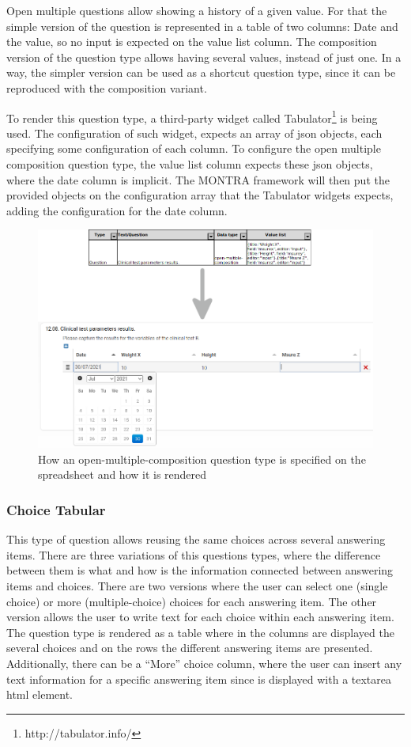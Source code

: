 Open multiple questions allow showing a history of a given value.
For that the simple version of the question is represented in a table of two columns: Date and the value, so no input is expected on the value list column.
The composition version of the question type allows having several values, instead of just one.
In a way, the simpler version can be used as a shortcut question type, since it can be reproduced with the composition variant.

To render this question type, a third-party widget called Tabulator\footnote{http://tabulator.info/} is being used.
The configuration of such widget, expects an array of \gls{json} objects, each specifying some configuration of each column.
To configure the open multiple composition question type, the value list column expects these \gls{json} objects, where the date column is implicit.
The MONTRA framework will then put the provided objects on the configuration array that the Tabulator widgets expects, adding the configuration for the date column.

\begin{figure}
    \center
    \includegraphics[width=\textwidth]{open-multiple}
    \caption{How an open-multiple-composition question type is specified on the spreadsheet and how it is rendered}
    \label{fig:open-multiple}
\end{figure}

\subsubsection*{Choice Tabular}

This type of question allows reusing the same choices across several answering items.
There are three variations of this questions types, where the difference between them is what and how is the information connected between answering items and choices.
There are two versions where the user can select one (single choice) or more (multiple-choice) choices for each answering item.
The other version allows the user to write text for each choice within each answering item.
The question type is rendered as a table where in the columns are displayed the several choices and on the rows the different answering items are presented.
Additionally, there can be a ``More'' choice column, where the user can insert any text information for a specific answering item since is displayed with a textarea \gls{html} element.

